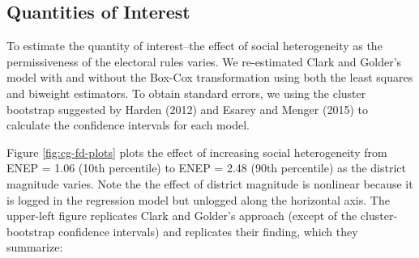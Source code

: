 \documentclass[12pt]{article}
\begin{document}


%

\subsection*{Quantities of Interest}

To estimate the quantity of interest--the effect of social heterogeneity as the permissiveness of the electoral rules varies. We re-estimated Clark and Golder's model with and without the Box-Cox transformation using both the least squares and biweight estimators. To obtain standard errors, we using the cluster bootstrap suggested by Harden (2012) and Esarey and Menger (2015) to calculate the confidence intervals for each model.

Figure \ref{fig:cg-fd-plots} plots the effect of increasing social heterogeneity from ENEP = 1.06 (10th percentile) to ENEP = 2.48 (90th percentile) as the district magnitude varies. Note the the effect of district magnitude is nonlinear because it is logged in the regression model but unlogged along the horizontal axis. The upper-left figure replicates Clark and Golder's approach (except of the cluster-bootstrap confidence intervals) and replicates their finding, which they summarize:
\end{document}
